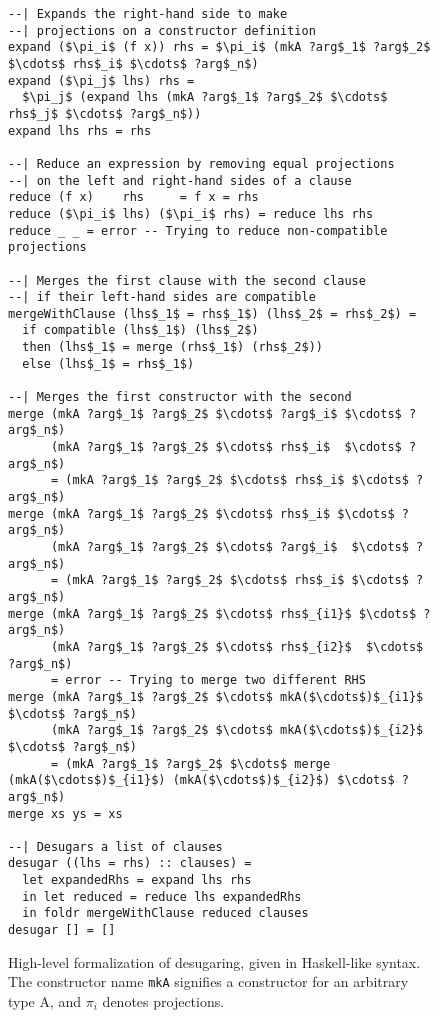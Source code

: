 \begin{figure}
\begin{lstlisting}[mathescape]
--| Expands the right-hand side to make 
--| projections on a constructor definition
expand ($\pi_i$ (f x)) rhs = $\pi_i$ (mkA ?arg$_1$ ?arg$_2$ $\cdots$ rhs$_i$ $\cdots$ ?arg$_n$)
expand ($\pi_j$ lhs) rhs = 
  $\pi_j$ (expand lhs (mkA ?arg$_1$ ?arg$_2$ $\cdots$ rhs$_j$ $\cdots$ ?arg$_n$))
expand lhs rhs = rhs

--| Reduce an expression by removing equal projections 
--| on the left and right-hand sides of a clause
reduce (f x)    rhs     = f x = rhs
reduce ($\pi_i$ lhs) ($\pi_i$ rhs) = reduce lhs rhs
reduce _ _ = error -- Trying to reduce non-compatible projections

--| Merges the first clause with the second clause
--| if their left-hand sides are compatible
mergeWithClause (lhs$_1$ = rhs$_1$) (lhs$_2$ = rhs$_2$) =
  if compatible (lhs$_1$) (lhs$_2$)
  then (lhs$_1$ = merge (rhs$_1$) (rhs$_2$))
  else (lhs$_1$ = rhs$_1$)

--| Merges the first constructor with the second
merge (mkA ?arg$_1$ ?arg$_2$ $\cdots$ ?arg$_i$ $\cdots$ ?arg$_n$)
      (mkA ?arg$_1$ ?arg$_2$ $\cdots$ rhs$_i$  $\cdots$ ?arg$_n$) 
      = (mkA ?arg$_1$ ?arg$_2$ $\cdots$ rhs$_i$ $\cdots$ ?arg$_n$)
merge (mkA ?arg$_1$ ?arg$_2$ $\cdots$ rhs$_i$ $\cdots$ ?arg$_n$)
      (mkA ?arg$_1$ ?arg$_2$ $\cdots$ ?arg$_i$  $\cdots$ ?arg$_n$) 
      = (mkA ?arg$_1$ ?arg$_2$ $\cdots$ rhs$_i$ $\cdots$ ?arg$_n$)
merge (mkA ?arg$_1$ ?arg$_2$ $\cdots$ rhs$_{i1}$ $\cdots$ ?arg$_n$)
      (mkA ?arg$_1$ ?arg$_2$ $\cdots$ rhs$_{i2}$  $\cdots$ ?arg$_n$) 
      = error -- Trying to merge two different RHS
merge (mkA ?arg$_1$ ?arg$_2$ $\cdots$ mkA($\cdots$)$_{i1}$ $\cdots$ ?arg$_n$)
      (mkA ?arg$_1$ ?arg$_2$ $\cdots$ mkA($\cdots$)$_{i2}$  $\cdots$ ?arg$_n$) 
      = (mkA ?arg$_1$ ?arg$_2$ $\cdots$ merge (mkA($\cdots$)$_{i1}$) (mkA($\cdots$)$_{i2}$) $\cdots$ ?arg$_n$)
merge xs ys = xs

--| Desugars a list of clauses
desugar ((lhs = rhs) :: clauses) =
  let expandedRhs = expand lhs rhs
  in let reduced = reduce lhs expandedRhs
  in foldr mergeWithClause reduced clauses
desugar [] = []
\end{lstlisting}
\caption{High-level formalization of desugaring, given in Haskell-like syntax. The constructor name \texttt{mkA} signifies a constructor for an arbitrary type A, and $\pi_i$ denotes projections.}
\label{fig:desugar_formalization}
\end{figure}

